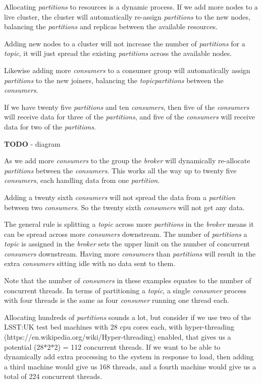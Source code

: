 \documentclass{article}
\newcommand{\kftopic} {\textit{topic}\xspace}
\newcommand{\kfbroker} {\textit{broker}\xspace}
\newcommand{\kfconsumer} {\textit{consumer}\xspace}
\newcommand{\kfconsumers} {\textit{consumers}\xspace}
\newcommand{\kfpartition} {\textit{partition}\xspace}
\newcommand{\kfpartitions} {\textit{partitions}\xspace}
\begin{document}
Allocating \kfpartitions to resources is a dynamic process. If we add more nodes to a live cluster, the cluster will automatically re-assign \kfpartitions to the new nodes, balancing the \kfpartitions and replicas between the available resources.

Adding new nodes to a cluster will not increase the number of \kfpartitions for a \kftopic, it will just spread the existing \kfpartitions across the available nodes.

Likewise adding more \kfconsumers to a consumer group will automatically assign \kfpartitions to the new joiners, balancing the \kftopic \kfpartitions between the \kfconsumers.

If we have twenty five \kfpartitions and ten \kfconsumers, then five of the \kfconsumers will receive data for three of the \kfpartitions, and five of the \kfconsumers will receive data for two of the \kfpartitions.

\textbf{TODO} - diagram

As we add more \kfconsumers to the group the \kfbroker will dynamically re-allocate \kfpartitions between the \kfconsumers.
This works all the way up to twenty five \kfconsumers, each handling data from one \kfpartition.

Adding a twenty sixth \kfconsumers will not spread the data from a \kfpartition between two \kfconsumers. So the twenty sixth \kfconsumers will not get any data.

The general rule is splitting a \kftopic across more \kfpartitions in the \kfbroker means it can be spread across more \kfconsumers downstream.
The number of \kfpartitions a \kftopic is assigned in the \kfbroker sets the upper limit on the number of concurrent \kfconsumers downstream.
Having more \kfconsumers than \kfpartitions will result in the extra \kfconsumers sitting idle with no data sent to them.

Note that the number of \kfconsumers in these examples equates to the number of concurrent threads. In terms of partitioning a \kftopic, a single \kfconsumer process with four threads is the same as
four \kfconsumer running one thread each.


Allocating hundreds of \kfpartitions sounds a lot, but consider if we use two of the LSST:UK test bed machines
with 28 cpu cores each, with hyper-threading (https://en.wikipedia.org/wiki/Hyper-threading) enabled,
that gives us a potential (28*2*2) = 112 concurrent threads.
If we want to be able to dynamically add extra processing to the system in response to load, then
adding a third machine would give us 168 threads, and a fourth machine would give us a total of 224
concurrent threads.
\end{document}
